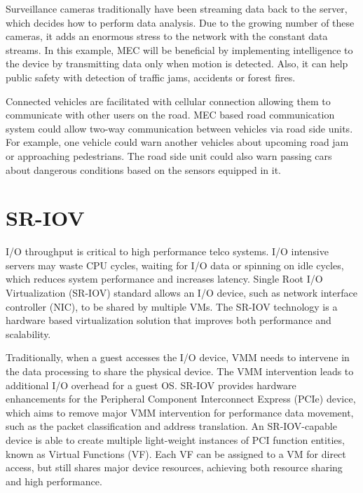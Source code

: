 Surveillance cameras traditionally have been streaming data back to the server, which decides how to perform data analysis. Due to the growing number of these cameras, it adds an enormous stress to the network with the constant data streams. In this example, MEC will be beneficial by implementing intelligence to the device by transmitting data only when motion is detected. Also, it can help public safety with detection of traffic jams, accidents or forest fires.

Connected vehicles are facilitated with cellular connection allowing them to communicate with other users on the road. MEC based road communication system could allow two-way communication between vehicles via road side units. For example, one vehicle could warn another vehicles about upcoming road jam or approaching pedestrians. The road side unit could also warn passing cars about dangerous conditions based on the sensors equipped in it. \cite{Abbas2018}

\section{SR-IOV}
\label{section:SR-IOV}

I/O throughput is critical to high performance telco systems. I/O intensive servers may waste CPU cycles, waiting for I/O data or spinning on idle cycles, which reduces system performance and increases latency. Single Root I/O Virtualization (SR-IOV) standard allows an I/O device, such as network interface controller (NIC), to be shared by multiple VMs. The SR-IOV technology is a hardware based virtualization solution that improves both performance and scalability. \cite{Dong2012}

Traditionally, when a guest accesses the I/O device, VMM needs to intervene in the data processing to share the physical device. The VMM intervention leads to additional I/O overhead for a guest OS. SR-IOV provides hardware enhancements for the Peripheral Component Interconnect Express (PCIe) device, which aims to remove major VMM intervention for performance data movement, such as the packet classification and address translation. An SR-IOV-capable device is able to create multiple light-weight instances of PCI function entities, known as Virtual Functions (VF). Each VF can be assigned to a VM for direct access, but still shares major device resources, achieving both resource sharing and high performance. \cite{Dong2012}


